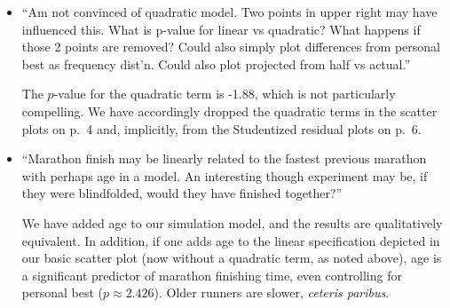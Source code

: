 \documentclass[12pt]{article}
\begin{document}
\begin{itemize}
\item ``Am not convinced of quadratic model. Two points in upper right
  may have influenced this. What is p-value for linear vs quadratic?
  What happens if those 2 points are removed? Could also simply plot
  differences from personal best as frequency dist'n. Could also plot
  projected from half vs actual.''

  The $p$-value for the quadratic term is -1.88, which is not
  particularly compelling.  We have accordingly dropped the quadratic
  terms in the scatter plots on p.\ 4 and, implicitly, from the
  Studentized residual plots on p.\ 6.
  
  
  
  
  
  
\item ``Marathon finish may be linearly related to the fastest
  previous marathon with perhaps age in a model. An interesting though
  experiment may be, if they were blindfolded, would they have
  finished together?''

  We have added age to our simulation model, and the results are
  qualitatively equivalent.  In addition, if one adds age to the
  linear specification depicted in our basic scatter plot (now without
  a quadratic term, as noted above), age is a significant predictor of
  marathon finishing time, even controlling for personal best
  ($p \approx 2.426$).  Older runners are slower, \emph{ceteris
    paribus}.


\end{itemize}
\end{document}
